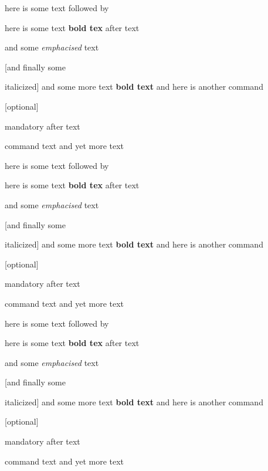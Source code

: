 here is some text followed by \mycommand

{here is some text \textbf

	{bold tex} after text}

{and some \emph

	{emphacised} text}

[and finally some \itshape

	{italicized}] and
some more text \textbf

{bold text} and here is another command \cmh

[optional]

{mandatory} after text \final

{command text} and yet more text

here is some text followed by \mycommand

{here is some text \textbf

	{bold tex} after text}

{and some \emph

	{emphacised} text}

[and finally some \itshape

	{italicized}] and
some more text \textbf

{bold text} and here is another command \cmh

[optional]

{mandatory} after text \final

{command text} and yet more text

here is some text followed by \mycommand

{here is some text \textbf

	{bold tex} after text}

{and some \emph

	{emphacised} text}

[and finally some \itshape

	{italicized}] and
some more text \textbf

{bold text} and here is another command \cmh

[optional]

{mandatory} after text \final

{command text} and yet more text
